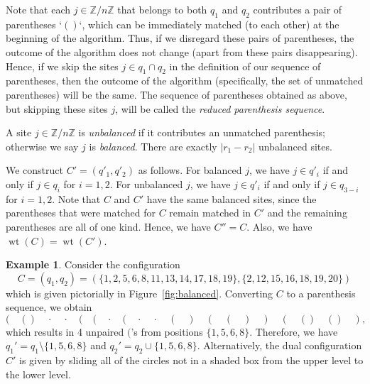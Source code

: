 \documentclass[reqno]{amsart}
\newcommand{\0}{\phantom{c}}
\DeclareMathOperator{\wt}{wt} %
\newcommand{\ZZ}{\mathbb{Z}}
\newcommand{\abs}[1]{\left| #1 \right|}
\newcommand{\defn}[1]{{\color{darkred}\emph{#1}}} %
\theoremstyle{plain}
\theoremstyle{definition}
\newtheorem{example}[thm]{Example}
\numberwithin{equation}{section}
\begin{document}
Note that each $j \in \ZZ/n\ZZ$ that belongs to both $q_1$ and $q_2$ contributes a pair of parentheses `$()$`, which can be immediately matched (to each other) at the beginning of the algorithm.
Thus, if we disregard these pairs of parentheses, the outcome of the algorithm does not change (apart from these pairs disappearing).
Hence, if we skip the sites $j \in q_1 \cap q_2$ in the definition of our sequence of parentheses, then the outcome of the algorithm (specifically, the set of unmatched parentheses) will be the same.
The sequence of parentheses obtained as above, but skipping these sites $j$, will be called the \defn{reduced parenthesis sequence}.

A site $j \in \ZZ/n\ZZ$ is \defn{unbalanced} if it contributes an unmatched parenthesis; otherwise we say $j$ is \defn{balanced}.
There are exactly $\abs{r_1 - r_2}$ unbalanced sites.

We construct $C' = (q'_1, q'_2)$ as follows.
For balanced $j$, we have $j \in q'_i$ if and only if $j \in q_i$ for $i=1,2$.
For unbalanced $j$, we have $j \in q'_i$ if and only if $j \in q_{3-i}$ for $i = 1,2$.
Note that $C$ and $C'$ have the same balanced sites, since the parentheses that were matched for $C$ remain matched in $C'$ and the remaining parentheses are all of one kind.
Hence, we have $C'' = C$. Also, we have $\wt(C) = \wt(C')$.

\begin{example}
\label{ex:parentheses_form}
Consider the configuration
\[
C = (q_1, q_2) = (\{1,2,5,6,8,11,13,14,17,18,19\}, \{2,12,15,16,18,19,20\})
\]
which is given pictorially in Figure~\ref{fig:balanced}.
Converting $C$ to a parenthesis sequence, we obtain
\[
( \quad () \quad \cdot \quad \cdot \quad ( \quad ( \quad \cdot \quad ( \quad \cdot \quad \cdot \quad ( \quad ) \quad ( \quad ( \quad ) \quad ) \quad ( \quad () \quad () \quad ),
\]
which results in 4 unpaired $($'s from positions $\{1,5,6,8\}$.
Therefore, we have $q_1' = q_1 \setminus \{1,5,6,8\}$ and $q_2' = q_2 \cup \{1,5,6,8\}$.
Alternatively, the dual configuration $C'$ is given by sliding all of the circles not in a shaded box from the upper level to the lower level.
\end{example}
\end{document}
